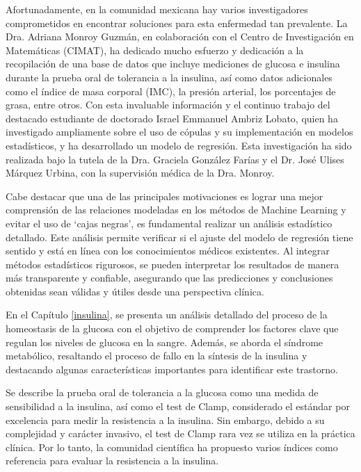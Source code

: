 Afortunadamente, en la comunidad mexicana hay varios investigadores comprometidos en encontrar soluciones para esta enfermedad tan prevalente. La Dra. Adriana Monroy Guzmán, en colaboración con el Centro de Investigación en Matemáticas (CIMAT), ha dedicado mucho esfuerzo y dedicación a la recopilación de una base de datos que incluye mediciones de glucosa e insulina durante la prueba oral de tolerancia a la insulina, así como datos adicionales como el índice de masa corporal (IMC), la presión arterial, los porcentajes de grasa, entre otros. Con esta invaluable información y el continuo trabajo del destacado estudiante de doctorado Israel Emmanuel Ambriz Lobato, quien ha investigado ampliamente sobre el uso de cópulas y su implementación en modelos estadísticos, y ha desarrollado un modelo de regresión. Esta investigación ha sido realizada bajo la tutela de la Dra. Graciela González Farías y el Dr. José Ulises Márquez Urbina, con la supervisión médica de la Dra. Monroy.

Cabe destacar que una de las principales motivaciones es lograr una mejor comprensión de las relaciones modeladas en los métodos de Machine Learning y evitar el uso de `cajas negras', es fundamental realizar un análisis estadístico detallado. Este análisis permite verificar si el ajuste del modelo de regresión tiene sentido y está en línea con los conocimientos médicos existentes. Al integrar métodos estadísticos rigurosos, se pueden interpretar los resultados de manera más transparente y confiable, asegurando que las predicciones y conclusiones obtenidas sean válidas y útiles desde una perspectiva clínica.

En el Capítulo \ref{insulina}, se presenta un análisis detallado del proceso de la homeostasis de la glucosa con el objetivo de comprender los factores clave que regulan los niveles de glucosa en la sangre. Además, se aborda el síndrome metabólico, resaltando el proceso de fallo en la síntesis de la insulina y destacando algunas características importantes para identificar este trastorno.

Se describe la prueba oral de tolerancia a la glucosa como una medida de sensibilidad a la insulina, así como el test de Clamp, considerado el estándar por excelencia para medir la resistencia a la insulina. Sin embargo, debido a su complejidad y carácter invasivo, el test de Clamp rara vez se utiliza en la práctica clínica. Por lo tanto, la comunidad científica ha propuesto varios índices como referencia para evaluar la resistencia a la insulina.

